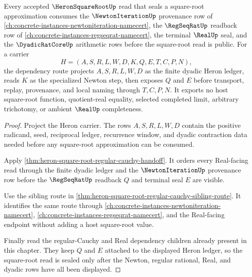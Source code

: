 \begin{theorem}
\label{thm:heron-square-root-newton-dependency-route}
Every accepted $\HeronSquareRootUp$ read that seals a square-root approximation consumes the $\NewtonIterationUp$ provenance row of \autoref{ch:concrete-instances-newtoniteration-namecert}, the $\RegSeqRatUp$ readback row of \autoref{ch:concrete-instances-regseqrat-namecert}, the terminal $\RealUp$ seal, and the $\DyadicRatCoreUp$ arithmetic rows before the square-root read is public. For a carrier
$$
H=(A,S,R,L,W,D,K,Q,E,T,C,P,N),
$$
the dependency route projects $A,S,R,L,W,D$ as the finite dyadic Heron ledger, reads $K$ as the specialized Newton step, then exposes $Q$ and $E$ before transport, replay, provenance, and local naming through $T,C,P,N$. It exports no host square-root function, quotient-real equality, selected completed limit, arbitrary trichotomy, or ambient $\RealUp$ completeness.
\end{theorem}
\begin{proof}
Project the Heron carrier. The rows $A,S,R,L,W,D$ contain the positive radicand, seed, reciprocal ledger, recurrence window, and dyadic contraction data needed before any square-root approximation can be consumed.

Apply \autoref{thm:heron-square-root-regular-cauchy-handoff}. It orders every Real-facing read through the finite dyadic ledger and the $\NewtonIterationUp$ provenance row before the $\RegSeqRatUp$ readback $Q$ and terminal seal $E$ are visible.

Use the sibling route in \autoref{thm:heron-square-root-regular-cauchy-sibling-route}. It identifies the same route through \autoref{ch:concrete-instances-newtoniteration-namecert}, \autoref{ch:concrete-instances-regseqrat-namecert}, and the Real-facing endpoint without adding a host square-root value.

Finally read the regular-Cauchy and Real dependency children already present in this chapter. They keep $Q$ and $E$ attached to the displayed Heron ledger, so the square-root read is sealed only after the Newton, regular rational, Real, and dyadic rows have all been displayed.
\end{proof}
